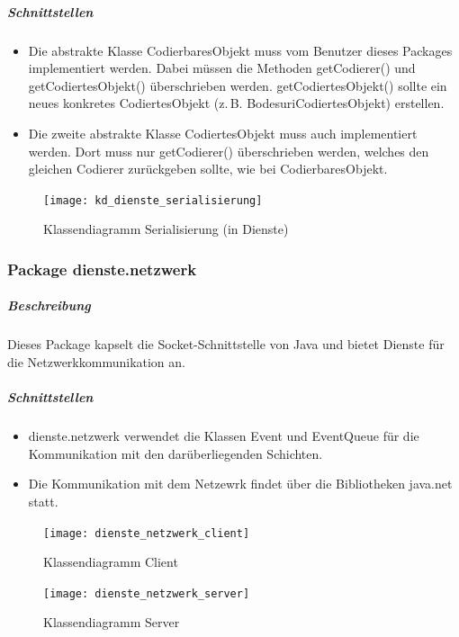 \documentclass[12pt,halfparskip]{scrartcl}
\begin{document}
\subparagraph{Schnittstellen}
\begin{itemize}
	\item Die abstrakte Klasse CodierbaresObjekt muss vom Benutzer dieses Packages implementiert werden. Dabei müssen die Methoden getCodierer() und getCodiertesObjekt() überschrieben werden. getCodiertesObjekt() sollte ein neues konkretes CodiertesObjekt (z.\,B. BodesuriCodiertesObjekt) erstellen.
	\item Die zweite abstrakte Klasse CodiertesObjekt muss auch implementiert werden. Dort muss nur getCodierer() überschrieben werden, welches den gleichen Codierer zurückgeben sollte, wie bei CodierbaresObjekt.
\end{itemize}

\begin{figure}[h]
	\centering
	\texttt{[image: kd\_dienste\_serialisierung]}
	\caption{Klassendiagramm Serialisierung (in Dienste)}
	\label{fig:kd_dienste_serialisierung}
\end{figure}

\clearpage
\subsubsection{Package dienste.netzwerk} %
\label{ssub:package_dienste_netzwerk}
\subparagraph{Beschreibung}
Dieses Package kapselt die Socket-Schnittstelle von Java und bietet Dienste für die Netzwerkkommunikation an.

\subparagraph{Schnittstellen} %
\label{ssub:schnittstellen}
\begin{itemize}
	\item dienste.netzwerk verwendet die Klassen Event und EventQueue für die Kommunikation mit den darüberliegenden Schichten.
	\item Die Kommunikation mit dem Netzewrk findet über die Bibliotheken java.net statt.
\end{itemize}

\begin{figure}[h]
	\centering
	\texttt{[image: dienste\_netzwerk\_client]}
	\caption{Klassendiagramm Client}
	\label{fig:dienste_netzwerk_client}
\end{figure}

\begin{figure}[h]
	\centering
	\texttt{[image: dienste\_netzwerk\_server]}
	\caption{Klassendiagramm Server}
	\label{fig:dienste_netzwerk_server}
\end{figure}

\end{document}
